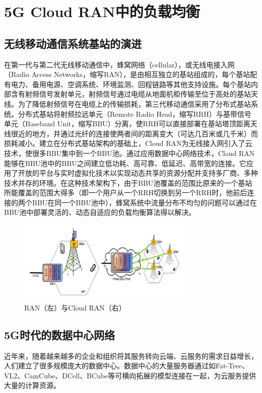 
\chapter{5G Cloud RAN中的负载均衡}
\label{chap:LB}
\section{无线移动通信系统基站的演进}
在第一代与第二代无线移动通信中，蜂窝网络（cellular），或无线电接入网（Radio Access Networks，缩写RAN），是由相互独立的基站组成的，每个基站配有电力、备用电源、空调系统、环境监测、回程链路等其他支持设施。每个基站内部含有射频信号发射单元，射频信号通过电缆从地面机柜传输至位于高处的基站天线。为了降低射频信号在电缆上的传输损耗，第三代移动通信采用了分布式基站系统。分布式基站将射频拉远单元（Remote Radio Head，缩写RRH）与基带信号单元（Baseband Unit，缩写BBU）分离，使RRH可以直接部署在基站塔顶距离天线很近的地方，并通过光纤的连接使两者间的距离变大（可达几百米或几千米）而损耗减小。建立在分布式基站架构的基础上，Cloud RAN为无线接入网引入了云技术，使很多BBU集中到一个BBU池。通过应用数据中心网络技术，Cloud RAN能够在BBU池中的BBU之间建立低功耗、高可靠、低延迟、高带宽的连接。它应用了开放的平台与实时虚拟化技术以实现动态共享的资源分配并支持多厂商、多种技术并存的环境。在这种技术架构下，由于BBU池覆盖的范围比原来的一个基站所能覆盖的范围大得多（即一个用户从一个RRH切换到另一个RRH时，他前后连接的两个BBU在同一个BBU池中）\cite{ran2015optimal}，蜂窝系统中流量分布不均匀的问题可以通过在BBU池中部署灵活的、动态自适应的负载均衡算法得以解决。
\begin{figure}[h]
    \centering
    \includegraphics[height=4cm]{figure/CRAN.png}
    \caption{RAN（左）与Cloud RAN（右） \cite{tsai2017load}}
    \label{fig:CRAN}
\end{figure}
\section{5G时代的数据中心网络}
近年来，随着越来越多的企业和组织将其服务转向云端、云服务的需求日益增长，人们建立了很多规模庞大的数据中心。数据中心的大量服务器通过如Fat-Tree\cite{alfares2008fattree}、VL2\cite{greenberg2009vl2}、CamCube\cite{costa2012camcube}、DCell\cite{guo2008dcell}、BCube\cite{guo2009bcube}等可横向拓展的模型连接在一起，为云服务提供大量的计算资源。
